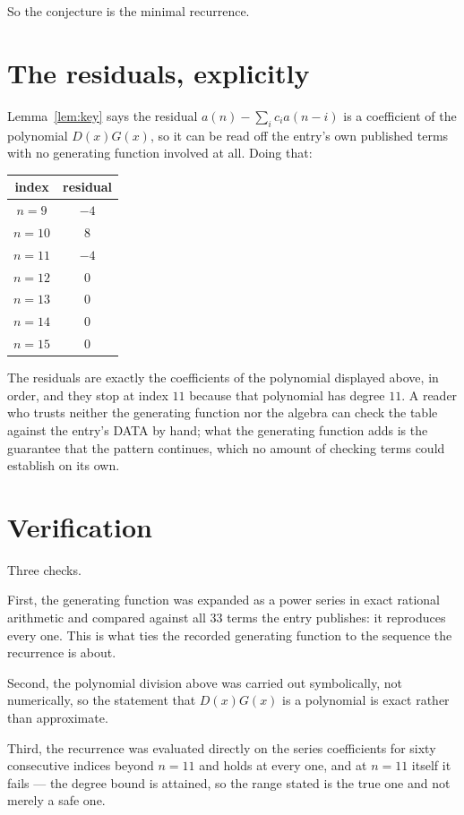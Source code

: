\documentclass[11pt,a4paper]{article}
\theoremstyle{plain}
\theoremstyle{definition}
\begin{document}
So the conjecture is the minimal recurrence.

\section{The residuals, explicitly}

Lemma~\ref{lem:key} says the residual $a(n)-\sum_ic_ia(n-i)$ is a coefficient of the
polynomial $D(x)G(x)$, so it can be read off the entry's own published terms with no
generating function involved at all. Doing that:
\begin{center}
\begin{tabular}{cc}
index & residual \\ \hline
$n=9$ & $-4$ \\
$n=10$ & $8$ \\
$n=11$ & $-4$ \\
$n=12$ & $0$ \\
$n=13$ & $0$ \\
$n=14$ & $0$ \\
$n=15$ & $0$
\end{tabular}
\end{center}
The residuals are exactly the coefficients of the polynomial displayed above, in order, and
they stop at index $11$ because that polynomial has degree $11$. A reader who trusts
neither the generating function nor the algebra can check the table against the entry's DATA
by hand; what the generating function adds is the guarantee that the pattern continues, which
no amount of checking terms could establish on its own.

\section{Verification}

Three checks.

First, the generating function was expanded as a power series in exact rational arithmetic and
compared against all $33$ terms the entry publishes: it reproduces every one. This is
what ties the recorded generating function to the sequence the recurrence is about.

Second, the polynomial division above was carried out symbolically, not numerically, so the
statement that $D(x)G(x)$ is a polynomial is exact rather than approximate.

Third, the recurrence was evaluated directly on the series coefficients for sixty consecutive
indices beyond $n=11$ and holds at every one, and at $n=11$ itself it fails --- the
degree bound is attained, so the range stated is the true one and not merely a safe one.
\end{document}
